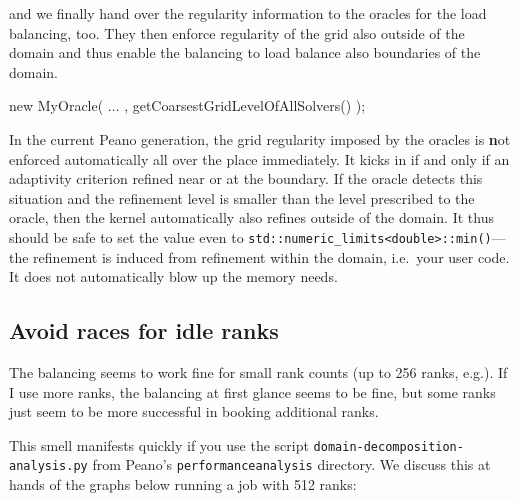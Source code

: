 \noindent
and we finally hand over the regularity information to the oracles for the load
balancing, too.
They then enforce regularity of the grid also outside of the domain and thus
enable the balancing to load balance also boundaries of the domain.
\begin{code}
  new MyOracle( ... , getCoarsestGridLevelOfAllSolvers() );
\end{code}


\begin{remark}
In the current Peano generation, the grid regularity imposed by the oracles is
{\textbf not} enforced automatically all over the place immediately. 
It kicks in if and only if an adaptivity criterion refined near or at the
boundary. 
If the oracle detects this situation and the refinement level is smaller than
the level prescribed to the oracle, then the kernel automatically also refines
outside of the domain.
It thus should be safe to set the value even to
\texttt{std::numeric\_limits\textless double\textgreater ::min()}---the
refinement is induced from refinement within the domain, i.e.~your user code.
It does not automatically blow up the memory needs.
\end{remark}


\subsection{Avoid races for idle ranks}

\begin{smell}
  The balancing seems to work fine for small rank counts (up to 256 ranks,
  e.g.). If I use more ranks, the balancing at first glance seems to be fine,
  but some ranks just seem to be more successful in booking additional ranks.
\end{smell}

\noindent
This smell manifests quickly if you use the script
\texttt{domain-decomposition-analysis.py} from Peano's
\texttt{performanceanalysis} directory. 
We discuss this at hands of the graphs below running a job with 512 ranks: 

